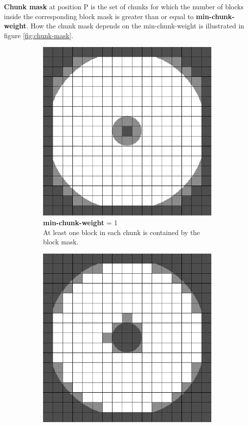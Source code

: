 \documentclass[12pt]{article}
\begin{document}
{\bfseries Chunk mask} at position P is the set of chunks for which the number of blocks inside the corresponding block mask is greater than or equal to {\bfseries min-chunk-weight}. How the chunk mask depends on the min-chunk-weight is illustrated in figure \ref{fig:chunk-mask}.

\begin{figure}[H]
\begin{subfigure}{0.5\textwidth}
\includegraphics[width=.9\linewidth]{min-chunk-weight=1.png}
\captionsetup{width=.8\linewidth}
\caption*{\textbf{min-chunk-weight} = 1\\
At least one block in each chunk is contained by the block mask.}
\end{subfigure}%
\begin{subfigure}{0.5\textwidth}
\centering
\includegraphics[width=.9\linewidth]{min-chunk-weight=256.png}

\end{subfigure}
\end{figure}
\end{document}
